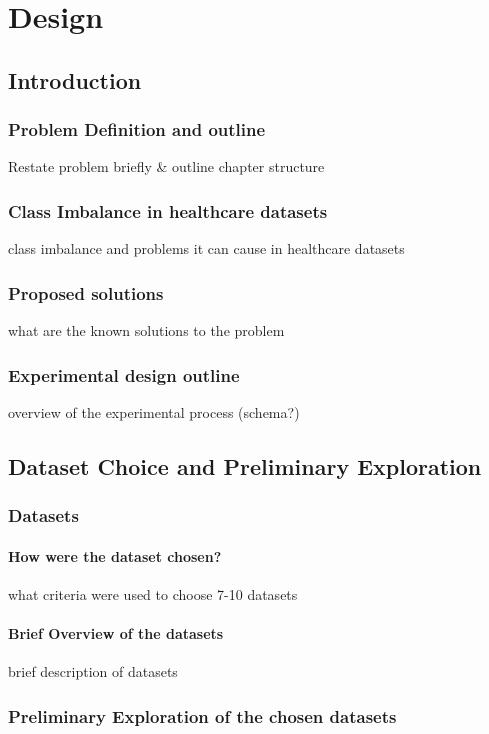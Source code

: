 \chapter{Design}\label{ch:Design}

\section{Introduction}
\subsection{Problem Definition and outline}
Restate problem briefly & outline chapter structure
\subsection{Class Imbalance in healthcare datasets}
class imbalance and problems it can cause in healthcare datasets
\subsection{Proposed solutions}
what are the known solutions to the problem
\subsection{Experimental design outline}
overview of the experimental process (schema?)

\section{Dataset Choice and Preliminary Exploration}
\subsection{Datasets}
\subsubsection{How were the dataset chosen?}
what criteria were used to choose 7-10 datasets

\subsubsection{Brief Overview of the datasets}
brief description of datasets
\subsection{Preliminary Exploration of the chosen datasets}
